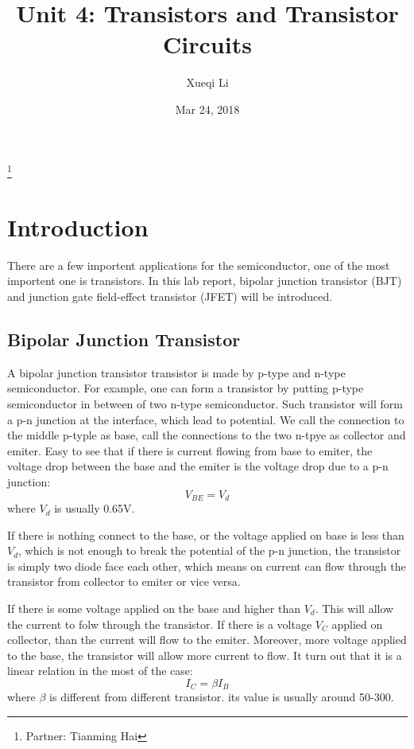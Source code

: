 \documentclass[aps,prl,reprint]{revtex4-1}
\begin{document}
\title{Unit 4: Transistors and Transistor Circuits}
\author{Xueqi Li}
\thanks{Partner: Tianming Hai}
\noaffiliation
\date{Mar 24, 2018}



\maketitle

\section{Introduction}  
There are a few importent applications for the semiconductor, one of the most importent one is transistors. In this lab report, bipolar junction transistor (BJT) and junction gate field-effect transistor (JFET) will be introduced.

\subsection{Bipolar Junction Transistor}
A bipolar junction transistor transistor is made by p-type and n-type semiconductor. For example, one can form a transistor by putting p-type semiconductor in between of two n-type semiconductor. Such transistor will form a p-n junction at the interface, which lead to potential. We call the connection to the middle p-typle as base, call the connections to the two n-tpye as collector and emiter. Easy to see that if there is current flowing from base to emiter, the voltage drop between the base and the emiter is the voltage drop due to a p-n junction:
\begin{equation}
    V_{B\!E} = V_d \label{eq:Vbd}
\end{equation}
where $V_d$ is usually 0.65V.

If there is nothing connect to the base, or the voltage applied on base is less than $V_d$, which is not enough to break the potential of the p-n junction, the transistor is simply two diode face each other, which means on current can flow through the transistor from collector to emiter or vice versa.

If there is some voltage applied on the base and higher than $V_d$. This will allow the current to folw through the transistor. If there is a voltage $V_C$ applied on collector, than the current will flow to the emiter. Moreover, more voltage applied to the base, the transistor will allow more current to flow. It turn out that it is a linear relation in the most of the case:
\begin{equation}
    I_C = \beta I_B \label{eq:ic}
\end{equation}
where $\beta$ is different from different transistor. its value is usually around 50-300.
\end{document}
